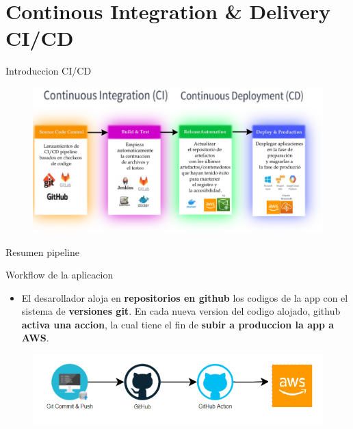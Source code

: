 \documentclass[xcolor=pdftex,dvipsnames,table]{beamer}
\begin{document}
\section{Continous Integration & Delivery CI/CD}
\begin{frame}{Introduccion CI/CD}
        \begin{figure}
            \centering
            \includegraphics[width=1\linewidth]{pipeline/ejamble .png}
            \label{fig:my_label}
        \end{figure}
\end{frame}
\begin{frame}{Resumen pipeline}

\begin{block}{Workflow de la aplicacion}
    \justifying
    \begin{itemize}
    \item {El desarollador aloja en \textbf{repositorios en github} los codigos de la app con el sistema de \textbf{versiones git}. En cada nueva version del codigo alojado, github \textbf{activa una accion}, la cual tiene el fin de \textbf{subir a produccion la app a AWS}.}
    \end{itemize}
\end{block}

\begin{figure}
        \centering
        \includegraphics[width=0.9\linewidth]{pipeline/basicdeploy.png}
        \label{fig:my_label}
    \end{figure}
\end{frame}
\end{document}
